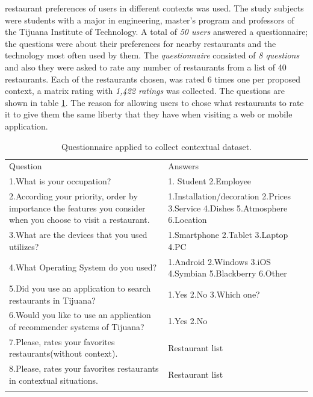 restaurant preferences of users in different contexts was used.
The study subjects were students  with a major in engineering,  
master's program and professors of the Tijuana Institute of
Technology. A total of \textit{50 users} answered a questionnaire; the
questions were about their preferences for nearby restaurants and the
technology most often used by them. The \textit{questionnaire} consisted 
of \textit{8 questions} and also they were asked to rate any number 
of restaurants from a list of 40 restaurants.
Each of the restaurants chosen, was rated 6 times one per proposed 
context, a matrix rating with \textit{1,422 ratings} was collected. The
questions are shown in table \ref{tab:questions}. The reason for allowing
users to chose what restaurants to rate it to give them the same liberty
that they have when visiting a web or mobile application. 
\begin{table}
\small
\captionsetup{font=footnotesize}
\caption{Questionnaire applied to collect contextual dataset.}
\label{tab:questions} 
\centering
\small
\begin{tabular}{p{7cm} p{5cm} }
\hline\noalign{\smallskip}
Question & Answers \\
\noalign{\smallskip}\hline\noalign{\smallskip}
\small{1.What is your occupation?} & \small{1. Student 2.Employee} \\ \hline  
\small{2.According your priority, order by importance the features 
you consider when you choose to visit a restaurant.} & 
\small{1.Installation/decoration 2.Prices 3.Service 4.Dishes
5.Atmosphere 6.Location} \\ \hline  
\small{3.What are the devices that you used
utilizes?} & \small{1.Smartphone 2.Tablet 3.Laptop 4.PC} \\ \hline   
\small{4.What Operating System do you used?} & 
\small{1.Android 2.Windows 3.iOS 4.Symbian 5.Blackberry 6.Other}
\\ \hline  
\small{5.Did you use an application to search restaurants in Tijuana?} &
\small{1.Yes 2.No 3.Which one?} \\ \hline   
\small{6.Would you like to use an application of
recommender systems of Tijuana?} & \small{1.Yes 2.No} \\ \hline  
\small{7.Please, rates your favorites restaurants(without context).} & 
\small{Restaurant list} \\ \hline
\small{8.Please, rates your favorites restaurants in contextual situations.} & 
\small{Restaurant list} \\
\noalign{\smallskip}\hline
\end{tabular}
\end{table}
